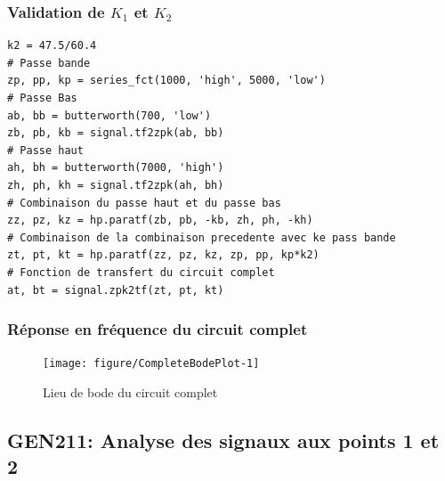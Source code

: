 \documentclass[10pt]{beamer}\usepackage[]{graphicx}\usepackage[]{xcolor}
\makeatletter
\newenvironment{kframe}{%
 \def\at@end@of@kframe{}%
 \ifinner\ifhmode%
  \def\at@end@of@kframe{\end{minipage}}%
  \begin{minipage}{\columnwidth}%
 \fi\fi%
 \def\FrameCommand##1{\hskip\@totalleftmargin \hskip-\fboxsep
 \colorbox{shadecolor}{##1}\hskip-\fboxsep
     \hskip-\linewidth \hskip-\@totalleftmargin \hskip\columnwidth}%
 \MakeFramed {\advance\hsize-\width
   \@totalleftmargin\z@ \linewidth\hsize
   \@setminipage}}%
 {\par\unskip\endMakeFramed%
 \at@end@of@kframe}
\newenvironment{knitrout}{}{} %
\makeatother
\begin{document}

\begin{frame}[fragile]
\frametitle{Validation de $K_1$ et $K_2$}
\begin{knitrout}\footnotesize
{}\color{fgcolor}\begin{kframe}
\begin{verbatim}
k2 = 47.5/60.4
# Passe bande
zp, pp, kp = series_fct(1000, 'high', 5000, 'low')
# Passe Bas
ab, bb = butterworth(700, 'low')
zb, pb, kb = signal.tf2zpk(ab, bb)
# Passe haut
ah, bh = butterworth(7000, 'high')
zh, ph, kh = signal.tf2zpk(ah, bh)
# Combinaison du passe haut et du passe bas
zz, pz, kz = hp.paratf(zb, pb, -kb, zh, ph, -kh)
# Combinaison de la combinaison precedente avec ke pass bande
zt, pt, kt = hp.paratf(zz, pz, kz, zp, pp, kp*k2)
# Fonction de transfert du circuit complet
at, bt = signal.zpk2tf(zt, pt, kt)
\end{verbatim}
\end{kframe}
\end{knitrout}
\end{frame}

\begin{frame}
\frametitle{Réponse en fréquence du circuit complet}
\begin{figure}
\centering %
\begin{knitrout}\footnotesize
{}\color{fgcolor}
\texttt{[image: figure/CompleteBodePlot-1]} 
\end{knitrout}
\caption{Lieu de bode du circuit complet}
\label{fig:complete-bode}
\end{figure}
\end{frame}


\subsection{GEN211: Analyse des signaux aux points 1 et 2}

\end{document}
